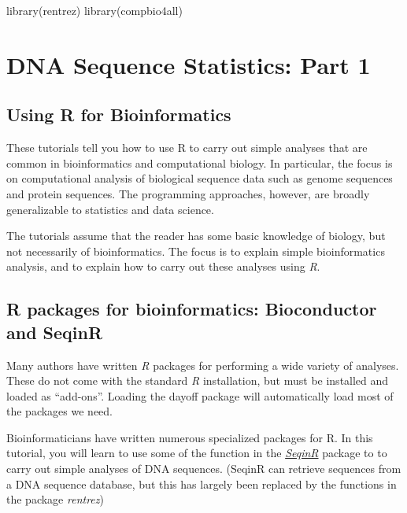 \documentclass[
]{book}
\newenvironment{Shaded}{\begin{snugshade}}{\end{snugshade}}
\newcommand{\FunctionTok}[1]{\textcolor[rgb]{0.00,0.00,0.00}{#1}}
\newcommand{\NormalTok}[1]{#1}
\begin{document}
\begin{Shaded}
\begin{Highlighting}[]
\FunctionTok{library}\NormalTok{(rentrez)}
\FunctionTok{library}\NormalTok{(compbio4all)}
\end{Highlighting}
\end{Shaded}

\hypertarget{dna-sequence-statistics-part-1}{%
\section{DNA Sequence Statistics: Part 1}\label{dna-sequence-statistics-part-1}}

\hypertarget{using-r-for-bioinformatics}{%
\subsection{Using R for Bioinformatics}\label{using-r-for-bioinformatics}}

These tutorials tell you how to use R to carry out simple analyses that are common in bioinformatics and computational biology. In particular, the focus is on computational analysis of biological sequence data such as genome sequences and protein sequences. The programming approaches, however, are broadly generalizable to statistics and data science.

The tutorials assume that the reader has some basic knowledge of biology, but not necessarily of bioinformatics. The focus is to explain simple bioinformatics analysis, and to explain how to carry out these analyses using \emph{R}.

\hypertarget{r-packages-for-bioinformatics-bioconductor-and-seqinr}{%
\subsection{R packages for bioinformatics: Bioconductor and SeqinR}\label{r-packages-for-bioinformatics-bioconductor-and-seqinr}}

Many authors have written \emph{R} packages for performing a wide variety of analyses. These do not come with the standard \emph{R} installation, but must be installed and loaded as ``add-ons''. Loading the dayoff package will automatically load most of the packages we need.

Bioinformaticians have written numerous specialized packages for R. In this tutorial, you will learn to use some of the function in the \href{https://cran.r-project.org/web/packages/seqinr/index.html}{\emph{SeqinR}} package to to carry out simple analyses of DNA sequences. (SeqinR can retrieve sequences from a DNA sequence database, but this has largely been replaced by the functions in the package \emph{rentrez})
\end{document}

